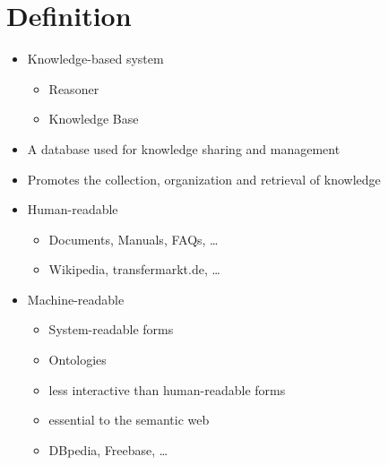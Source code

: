 \section{Definition}

\begin{frame}

\begin{itemize}
  \item Knowledge-based system
  \begin{itemize}
    \item Reasoner
    \item Knowledge Base
  \end{itemize}
  
	\item A database used for knowledge sharing and management
	\item Promotes the collection, organization and retrieval of knowledge
\end{itemize}

\end{frame}

\begin{frame}

\begin{itemize}
    \item Human-readable
    \begin{itemize}
      \item Documents, Manuals, FAQs, \ldots
      \item Wikipedia, transfermarkt.de, \ldots
    \end{itemize}
    
    \item Machine-readable
    \begin{itemize}
      \item System-readable forms
      \item Ontologies
      \item less interactive than human-readable forms
      \item essential to the semantic web
      \item DBpedia, Freebase, \ldots
    \end{itemize}
    
\end{itemize}

\end{frame}
